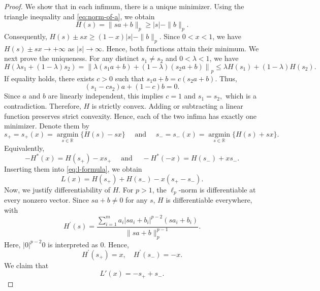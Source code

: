 \documentclass[11pt,a4paper]{amsart}
\theoremstyle{plain}
\theoremstyle{definition}
\begin{document}
\begin{proof}
We show that in each infimum, there is a unique minimizer. Using the triangle inequality and \eqref{eq:norm-of-a}, we obtain 
$$
    H(s)=\|s a+b\|_p \geq |s|-\|b\|_p .
$$
Consequently,
$
H(s) \pm s x \geq(1-x)|s|-\|b\|_p .
$
Since $0<x<1$, we have
$
H(s)\pm s x \longrightarrow+\infty 
$
as $|s| \rightarrow \infty$. Hence, both functions attain their minimum. 
We next prove the uniqueness. For any distinct $s_1 \neq s_2$ and $0<\lambda<1$, we have
$$
H\left(\lambda s_1+(1-\lambda) s_2\right) =\left\|\lambda\left(s_1 a+b\right)+(1-\lambda)\left(s_2 a+b\right)\right\|_p \leq \lambda H\left(s_1\right)+(1-\lambda) H\left(s_2\right).
$$
If equality holds, there exists $c>0$ such that
$
s_1 a+b=c\left(s_2 a+b\right) .
$
Thus,
$$
\left(s_1-c s_2\right) a+(1-c) b=0 .
$$
Since $a$ and $b$ are linearly independent, this implies
$
c=1 $ and  $s_1=s_2,
$
which is a contradiction. Therefore, $H$ is strictly convex. Adding or subtracting a linear function preserves strict convexity. Hence, each of the two infima has exactly one minimizer. Denote them by
\[
    s_{+}=s_{+}(x)=\underset{s \in \mathbb{R}}{\operatorname{argmin}}\{H(s)-s x\}
    \quad \text { and }\quad
    s_{-}= s_{-}(x)=\underset{s \in \mathbb{R}}{\operatorname{argmin}}\{H(s)+s x\} .
\]
Equivalently,
\begin{equation} \label{eq:Legre-H-s}
-H^*(x)=H\left(s_{+}\right)-x s_{+} \quad \text { and }\quad
-H^*(-x)=H\left(s_{-}\right)+x s_{-} .
\end{equation}
Inserting them into \eqref{eq:l-formula}, we obtain
\begin{equation} \label{eq:l-formula-in-H}
    L(x)=H\left(s_{+}\right)+H\left(s_{-}\right)-x\left(s_{+}-s_{-}\right) .
\end{equation}
Now, we justify differentiability of $H$. For $p>1$, the $\ell_p$-norm is differentiable at every nonzero vector. Since $sa+b \neq 0$ for any $s$, $H$ is differentiable everywhere, with
\begin{equation} \label{eq:formula-H-prime}
H^{\prime}(s)=\frac{\sum_{i=1}^m a_i\left|s a_i+b_i\right|^{p-2}\left(s a_i+b_i\right)}{\|s a+b\|_p^{p-1}} .
\end{equation}
Here, $|0|^{p-2} 0$ is interpreted as $0$. Hence,
\begin{equation} \label{eq:H-prime-s}
    H^{\prime}\left(s_{+}\right)=x, \quad H^{\prime}\left(s_{-}\right)=-x .    
\end{equation}
We claim that
\begin{equation} \label{eq:l-prime-formula}
    L'(x)=-s_+ +s_-.
\end{equation}

\end{proof}
\end{document}
